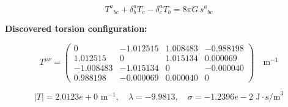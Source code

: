 
\begin{equation}
  T^a{}_{bc} + \delta^a_b T_c - \delta^a_c T_b = 8\pi G \, s^a{}_{bc}
\end{equation}

\textbf{Discovered torsion configuration:}

\begin{equation}
  T^{\mu\nu} = \begin{pmatrix}
    0 & -1.012515 & 1.008483 & -0.988198 \\
    1.012515 & 0 & 1.015134 & 0.000069 \\
    -1.008483 & -1.015134 & 0 & -0.000040 \\
    0.988198 & -0.000069 & 0.000040 & 0
  \end{pmatrix} \quad \text{m}^{-1}
\end{equation}

\begin{equation}
  |T| = 2.0123e+0 \text{ m}^{-1}, \quad
  \lambda = -9.9813, \quad
  \sigma = -1.2396e-2 \text{ J}\cdot\text{s/m}^3
\end{equation}